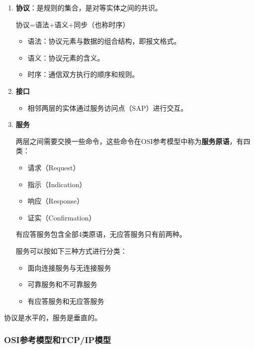\documentclass[12pt, a4paper, oneside]{ctexart}
\begin{document}
\begin{enumerate}
    \item {\bf 协议}：是规则的集合，是对等实体之间的共识。
    
    协议=语法+语义+同步（也称时序）
    \begin{itemize}
        \item 语法：协议元素与数据的组合结构，即报文格式。
        \item 语义：协议元素的含义。
        \item 时序：通信双方执行的顺序和规则。
    \end{itemize}
    \item {\bf 接口}
    \begin{itemize}
        \item 相邻两层的实体通过服务访问点（SAP）进行交互。
    \end{itemize}
    \item {\bf 服务}
    
    两层之间需要交换一些命令，这些命令在OSI参考模型中称为\textbf{服务原语}，有四类：
    \begin{itemize}
        \item 请求（Request）
        \item 指示（Indication）
        \item 响应（Response）
        \item 证实（Confirmation）
    \end{itemize}
    有应答服务包含全部4类原语，无应答服务只有前两种。

    服务可以按如下三种方式进行分类：
    \begin{itemize}
        \item 面向连接服务与无连接服务
        \item 可靠服务和不可靠服务
        \item 有应答服务和无应答服务
    \end{itemize}
\end{enumerate}

协议是水平的，服务是垂直的。

\subsubsection{OSI参考模型和TCP/IP模型}
\end{document}
